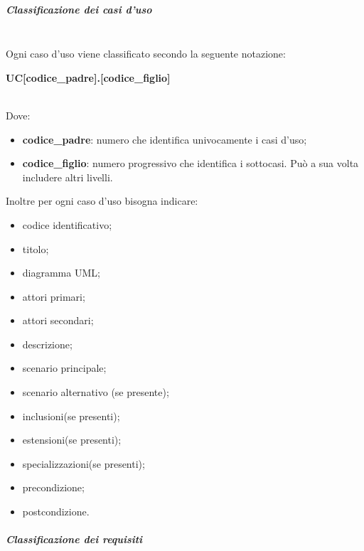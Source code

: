 			\subparagraph*{Classificazione dei casi d'uso} \mbox{}\\
			\noindent Ogni caso d'uso viene classificato secondo la seguente notazione: \newline \newline
			\centerline{\textbf{UC[codice\_padre].[codice\_figlio]}} \\
			Dove:
				\begin{itemize}
					\item \textbf{codice\_padre}: numero che identifica univocamente i casi 
						d'uso;
					\item \textbf{codice\_figlio}: numero progressivo che identifica i 
						sottocasi. Può a sua volta includere altri livelli. \\
				\end{itemize}
			Inoltre per ogni caso d'uso bisogna indicare:
				\begin{itemize}
					\item codice identificativo;
					\item titolo;
					\item diagramma UML\glo;
					\item attori primari;
					\item attori secondari;
					\item descrizione;
					\item scenario principale;
					\item scenario alternativo (se presente);
					\item inclusioni(se presenti);
					\item estensioni(se presenti);
					\item specializzazioni(se presenti);
					\item precondizione;
					\item postcondizione. \\
				\end{itemize}
				
			\subparagraph*{Classificazione dei requisiti} \mbox{}\\ \label{sec:UC}
			
